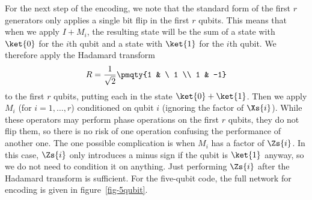 For the next step of the encoding, we note that the standard form of the
first $r$ generators only applies a single bit flip in the first $r$ qubits.
This means that when we apply $I + M_i$, the resulting state will be the
sum of a state with $\ket{0}$ for the $i$th qubit and a state with $\ket{1}$
for the $i$th qubit.  We therefore apply the Hadamard transform
\begin{equation}
	R = \frac{1}{\sqrt{2}} \pmqty{1 & \ 1 \\ 1 & -1}
	\label{eq-hadamard}
\end{equation}
to the first $r$ qubits, putting each in the state $\ket{0} + \ket{1}$.  Then
we apply $M_i$ (for $i = 1, \ldots, r$) conditioned on qubit $i$ (ignoring
the factor of $\Xs{i}$).  While these operators may perform phase
operations on the first $r$ qubits, they do not flip them, so there is no risk
of one operation confusing the performance of another one.  The one
possible complication is when $M_i$ has a factor of $\Zs{i}$.  In this case,
$\Zs{i}$ only introduces a minus sign if the qubit is $\ket{1}$ anyway, so we
do not need to condition it on anything.  Just performing $\Zs{i}$ after the
Hadamard transform is sufficient.  For the five-qubit code, the full network
for encoding is given in figure~\ref{fig-5qubit}.
